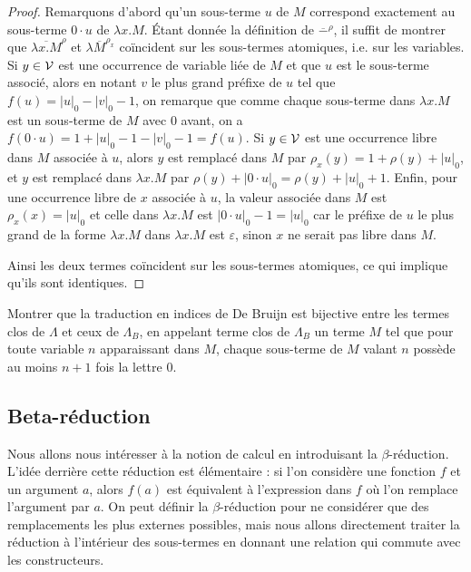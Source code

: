 \begin{proof}
    Remarquons d'abord qu'un sous-terme $u$ de $M$ correspond exactement au sous-terme $0\cdot u$ de $\lambda x.M$. \'Etant donnée la définition de $\overline -^\rho$, il suffit de montrer que $\overline{\lambda x.M}^\rho$ et $\lambda \overline M^{\rho_x}$ coïncident sur les sous-termes atomiques, i.e. sur les variables. Si $y\in\mathcal V$ est une occurrence de variable liée de $M$ et que $u$ est le sous-terme associé, alors en notant $v$ le plus grand préfixe de $u$ tel que $f(u) = |u|_0-|v|_0-1$, on remarque que comme chaque sous-terme dans $\lambda x.M$ est un sous-terme de $M$ avec $0$ avant, on a $f(0\cdot u) = 1+|u|_0 - 1 - |v|_0 - 1 = f(u)$. Si $y\in\mathcal V$ est une occurrence libre dans $M$ associée à $u$, alors $y$ est remplacé dans $M$ par $\rho_x(y) = 1 + \rho(y) + |u|_0$, et $y$ est remplacé dans $\lambda x.M$ par $\rho(y) + |0\cdot u|_0 = \rho(y) + |u|_0 + 1$. Enfin, pour une occurrence libre de $x$ associée à $u$, la valeur associée dans $M$ est $\rho_x(x) = |u|_0$ et celle dans $\lambda x.M$ est $|0\cdot u|_0 - 1 = |u|_0$ car le préfixe de $u$ le plus grand de la forme $\lambda x.M$ dans $\lambda x.M$ est $\varepsilon$, sinon $x$ ne serait pas libre dans $M$.

    Ainsi les deux termes coïncident sur les sous-termes atomiques, ce qui implique qu'ils sont identiques.
\end{proof}

\begin{exo}
    Montrer que la traduction en indices de De Bruijn est bijective entre les termes clos de $\Lambda$ et  ceux de $\Lambda_B$, en appelant terme clos de $\Lambda_B$ un terme $M$ tel que pour toute variable $n$ apparaissant dans $M$, chaque sous-terme de $M$ valant $n$ possède au moins $n+1$ fois la lettre $0$.
\end{exo}

\subsection{Beta-réduction}

Nous allons nous intéresser à la notion de calcul en introduisant la $\beta$-réduction. L'idée derrière cette réduction est élémentaire : si l'on considère une fonction $f$ et un argument $a$, alors $f(a)$ est équivalent à l'expression dans $f$ où l'on remplace l'argument par $a$. On peut définir la $\beta$-réduction pour ne considérer que des remplacements les plus externes possibles, mais nous allons directement traiter la réduction à l'intérieur des sous-termes en donnant une relation qui commute avec les constructeurs.

